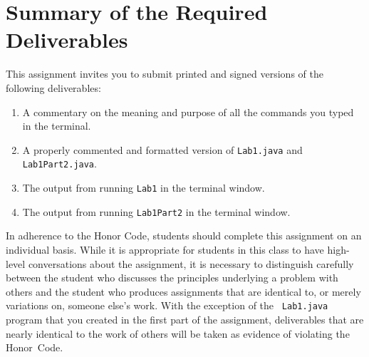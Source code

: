 \documentclass[11pt]{article}
\begin{document}
\section*{Summary of the Required Deliverables}

This assignment invites you to submit printed and signed versions of the following deliverables:

\vspace*{-.1in}
\begin{enumerate}
  \setlength{\itemsep}{0in}
\item A commentary on the meaning and purpose of all the commands you typed in the terminal.
\item A properly commented and formatted version of {\tt Lab1.java} and {\tt Lab1Part2.java}.
\item The output from running {\tt Lab1} in the terminal window.
\item The output from running {\tt Lab1Part2} in the terminal window.
\end{enumerate}
\vspace*{-.1in}

In adherence to the Honor Code, students should complete this assignment on an individual basis. While it is appropriate
for students in this class to have high-level conversations about the assignment, it is necessary to distinguish
carefully between the student who discusses the principles underlying a problem with others and the student who produces
assignments that are identical to, or merely variations on, someone else's work.  With the exception of the {\tt
Lab1.java} program that you created in the first part of the assignment, deliverables that are nearly identical to the
work of others will be taken as evidence of violating the \mbox{Honor Code}.


\end{document}
